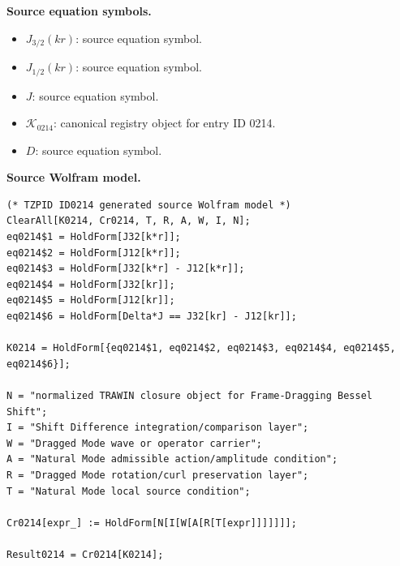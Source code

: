 \begin{minipage}[t]{0.49\linewidth}
\begingroup
\small
\raggedright
\textbf{Source equation symbols.}\par
\begin{itemize}[leftmargin=1.35em,itemsep=1pt,topsep=1pt,parsep=0pt]
    \item $J_{3/2}(kr)$: source equation symbol.
    \item $J_{1/2}(kr)$: source equation symbol.
    \item $J$: source equation symbol.
    \item $\mathcal{K}_{0214}$: canonical registry object for entry ID 0214.
    \item $D$: source equation symbol.
\end{itemize}
\endgroup
\end{minipage}\hfill
\begin{minipage}[t]{0.47\linewidth}
\begingroup
\scriptsize
\raggedright
\textbf{Source Wolfram model.}\par
\begin{Verbatim}[fontsize=\tiny,breaklines=true,breakanywhere=true]
(* TZPID ID0214 generated source Wolfram model *)
ClearAll[K0214, Cr0214, T, R, A, W, I, N];
eq0214$1 = HoldForm[J32[k*r]];
eq0214$2 = HoldForm[J12[k*r]];
eq0214$3 = HoldForm[J32[k*r] - J12[k*r]];
eq0214$4 = HoldForm[J32[kr]];
eq0214$5 = HoldForm[J12[kr]];
eq0214$6 = HoldForm[Delta*J == J32[kr] - J12[kr]];

K0214 = HoldForm[{eq0214$1, eq0214$2, eq0214$3, eq0214$4, eq0214$5, eq0214$6}];

N = "normalized TRAWIN closure object for Frame-Dragging Bessel Shift";
I = "Shift Difference integration/comparison layer";
W = "Dragged Mode wave or operator carrier";
A = "Natural Mode admissible action/amplitude condition";
R = "Dragged Mode rotation/curl preservation layer";
T = "Natural Mode local source condition";

Cr0214[expr_] := HoldForm[N[I[W[A[R[T[expr]]]]]]];

Result0214 = Cr0214[K0214];
\end{Verbatim}
\endgroup
\end{minipage}

